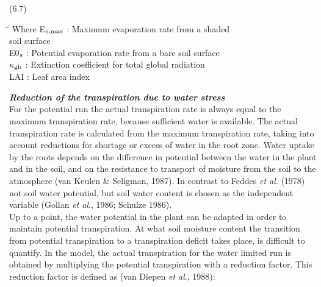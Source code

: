 \documentclass[11pt]{article}
\begin{document}
 \bigskip
\strut\hfill (6.7)
\nwln
\begin{tabbing}
\hspace{1.27cm}\=\hspace{1.27cm}\=\hspace{1.27cm}\=\hspace{1.27cm}\=%
\hspace{1.27cm}\=\hspace{1.27cm}\=\hspace{1.27cm}\=\hspace{1.27cm}\=%
\hspace{1.27cm}\=\hspace{1.27cm}\=\kill
Where\> \> E$_{{\rm s,max}}$\> : Maximum evaporation rate from a shaded \\
\>\> \>   soil surface\> \> \> \> \> \> \> [cm d$^{{\rm -1}}$]\\
\>\> E0$_{{\rm s}}$\> : Potential evaporation rate from a bare soil surface\> \> \> \> \> \> \> [cm d$^{{\rm -1}}$]\\
\>\> $\kappa$$_{{\rm gb}}$\> : Extinction coefficient for total global radiation\> \> \> \> \> \> \> [-]\\
\>\> LAI\> : Leaf area index\> \> \> \> \> \> \> [ha ha$^{{\rm -1}}$]
\end{tabbing}

\bigskip
\bigskip
\bigskip
{\bf {\it Reduction of the transpiration due to water stress\/}}\\
For the potential run the actual transpiration rate is always equal to the maximum
transpira\-tion rate, because sufficient water is available. The actual transpiration rate is
calculated from the maximum transpiration rate, taking into account reductions for
shortage or excess of water in the root zone. Water uptake by the roots depends on the
difference in potential between the water in the plant and in the soil, and on the resistance
to transport of moisture from the soil to the atmosphere (van Keulen \& Seligman, 1987).
In contrast to Feddes {\it et al\/}. (1978) not soil water potential, but soil water content is
chosen as the independent variable (Gollan {\it et al\/}., 1986; Schulze 1986). \\
Up to a point, the water potential in the plant can be adapted in order to maintain
potential transpiration. At what soil moisture content the transition from potential
transpiration to a transpiration deficit takes place, is difficult to quantify. In the model,
the actual transpira\-tion for the water limited run is obtained by multiplying the potential
transpiration with a reduction factor. This reduction factor is defined as (van Diepen {\it et
al\/}., 1988):
\end{document}
